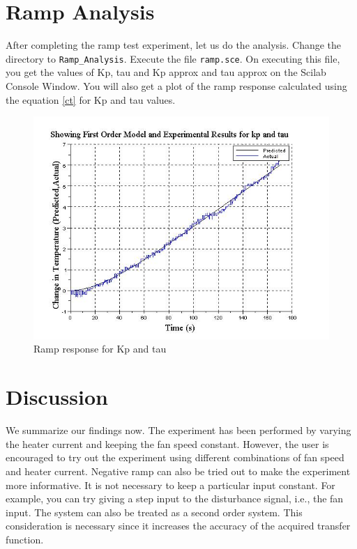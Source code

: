 \section{Ramp Analysis}
After completing the ramp test experiment, let us do the analysis. Change the directory to {\tt Ramp\_Analysis}. Execute the file {\tt ramp.sce}. On executing this file, you get the values of Kp, tau and Kp approx and tau approx on the Scilab Console Window. You will also get a plot of the ramp response calculated using the equation \ref{ct} for Kp and tau values.
\begin{figure}[h]
	\centering
		\includegraphics[width=\linewidth]{Ramp-test_manual/fit_curve_ramp.jpg}
	\caption{Ramp response for Kp and tau}
	\label{fig:fit_curve_ramp}
\end{figure}

\section{Discussion}
We summarize our findings now. The experiment has been performed by varying the heater current and keeping the fan speed constant. However, the user is encouraged to try out the experiment using different combinations of fan speed and heater current. Negative ramp can also be tried out to make the experiment more informative. It is not necessary to keep a particular input constant. For example, you can try giving a step input to the disturbance signal, i.e., the fan input. The system can also be treated as a second order system. This consideration is necessary since it increases the accuracy of the acquired transfer function.\cite{kmm09}
